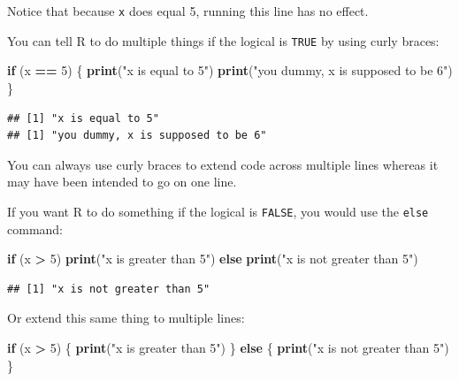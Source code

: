 \documentclass[]{book}
\newenvironment{Shaded}{\begin{snugshade}}{\end{snugshade}}
\newcommand{\ControlFlowTok}[1]{\textcolor[rgb]{0.13,0.29,0.53}{\textbf{#1}}}
\newcommand{\DecValTok}[1]{\textcolor[rgb]{0.00,0.00,0.81}{#1}}
\newcommand{\KeywordTok}[1]{\textcolor[rgb]{0.13,0.29,0.53}{\textbf{#1}}}
\newcommand{\NormalTok}[1]{#1}
\newcommand{\OperatorTok}[1]{\textcolor[rgb]{0.81,0.36,0.00}{\textbf{#1}}}
\newcommand{\StringTok}[1]{\textcolor[rgb]{0.31,0.60,0.02}{#1}}
\begin{document}
Notice that because \texttt{x} does equal 5, running this line has no effect.

You can tell R to do multiple things if the logical is \texttt{TRUE} by using curly braces:

\begin{Shaded}
\begin{Highlighting}[]
\ControlFlowTok{if}\NormalTok{ (x }\OperatorTok{==}\StringTok{ }\DecValTok{5}\NormalTok{) \{}
  \KeywordTok{print}\NormalTok{(}\StringTok{"x is equal to 5"}\NormalTok{)}
  \KeywordTok{print}\NormalTok{(}\StringTok{"you dummy, x is supposed to be 6"}\NormalTok{)}
\NormalTok{\}}
\end{Highlighting}
\end{Shaded}

\begin{verbatim}
## [1] "x is equal to 5"
## [1] "you dummy, x is supposed to be 6"
\end{verbatim}

You can always use curly braces to extend code across multiple lines whereas it may have been intended to go on one line.

If you want R to do something if the logical is \texttt{FALSE}, you would use the \texttt{else} command:

\begin{Shaded}
\begin{Highlighting}[]
\ControlFlowTok{if}\NormalTok{ (x }\OperatorTok{>}\StringTok{ }\DecValTok{5}\NormalTok{) }\KeywordTok{print}\NormalTok{(}\StringTok{"x is greater than 5"}\NormalTok{) }\ControlFlowTok{else} \KeywordTok{print}\NormalTok{(}\StringTok{"x is not greater than 5"}\NormalTok{)}
\end{Highlighting}
\end{Shaded}

\begin{verbatim}
## [1] "x is not greater than 5"
\end{verbatim}

Or extend this same thing to multiple lines:

\begin{Shaded}
\begin{Highlighting}[]
\ControlFlowTok{if}\NormalTok{ (x }\OperatorTok{>}\StringTok{ }\DecValTok{5}\NormalTok{) \{}
  \KeywordTok{print}\NormalTok{(}\StringTok{"x is greater than 5"}\NormalTok{)}
\NormalTok{\} }\ControlFlowTok{else}\NormalTok{ \{}
  \KeywordTok{print}\NormalTok{(}\StringTok{"x is not greater than 5"}\NormalTok{)}
\NormalTok{\} }
\end{Highlighting}
\end{Shaded}
\end{document}
